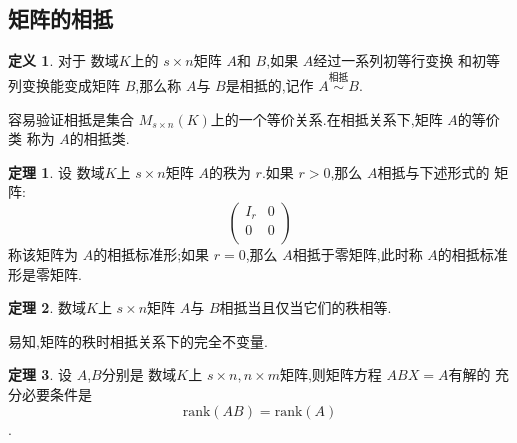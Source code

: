 \documentclass[a4paper,11pt]{article}%
\theoremstyle{remark}
\theoremstyle{definition}
\newtheorem{theorem}{定理}[section]
\theoremstyle{definition}
\newtheorem*{definition}{定义}
\theoremstyle{plain}
\begin{document}
\subsection{矩阵的相抵}
\begin{definition}
    对于 数域$K$上的 $s\times n$矩阵 $A$和 $B$,如果 $A$经过一系列初等行变换
    和初等列变换能变成矩阵 $B$,那么称 $A$与 $B$是相抵的,记作 $A\overset{\text{相抵}}{\sim}B$.     
\end{definition}
容易验证相抵是集合 $M _{s\times n}(K)$上的一个等价关系.在相抵关系下,矩阵 $A$的等价类
称为 $A$的相抵类.
\begin{theorem}
    设 数域$K$上 $s\times n$矩阵 $A$的秩为 $r$.如果 $r>0$,那么 $A$相抵与下述形式的
    矩阵:
    \[\begin{pmatrix}
        I_r&0\\
        0&0\\
    \end{pmatrix}\]
    称该矩阵为 $A$的相抵标准形;如果 $r=0$,那么 $A$相抵于零矩阵,此时称 $A$的相抵标准形是零矩阵.
\end{theorem}
\begin{theorem}
    数域$K$上 $s\times n$矩阵 $A$与 $B$相抵当且仅当它们的秩相等.
\end{theorem}
    易知,矩阵的秩时相抵关系下的完全不变量.
\begin{theorem}
    设 $A$,$B$分别是 数域$K$上 $s\times n,n\times m$矩阵,则矩阵方程 $ABX=A$有解的
    充分必要条件是
    \[\text{rank}(AB)=\text{rank}(A)\].
\end{theorem}
\end{document}
